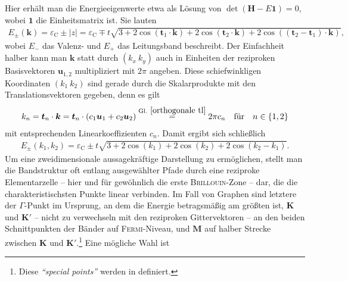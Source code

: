 \documentclass[a4paper, 10pt, twoside, openany]{book} %
\newcommand \braces[1]{\left \lbrace #1 \right \rbrace}
\def \vec {\boldsymbol}
\def \eC {\varepsilon_\mathrm{C}}
\begin{document}
Hier erhält man die Energieeigenwerte etwa als Lösung von $\det(\vec H - E \vec 1) = 0$, wobei $\vec 1$ die Einheitsmatrix ist. Sie lauten
%
\begin{align*}
    E_\pm(\vec k) = \eC \pm |z| = \eC \mp t \sqrt{3 + 2 \cos(\vec t_1 \cdot \vec k) + 2 \cos(\vec t_2 \cdot \vec k) + 2 \cos((\vec t_2 - \vec t_1) \cdot \vec k)},
\end{align*}
%
wobei $E_-$ das Valenz- und $E_+$ das Leitungsband beschreibt. Der Einfachheit halber kann man $\vec k$ statt durch $(k_x \ k_y)$ auch in Einheiten der reziproken Basisvektoren $\vec u_{1, 2}$ multipliziert mit $2 \pi$ angeben. Diese schiefwinkligen Koordinaten $(k_1 \ k_2)$ sind gerade durch die Skalarprodukte mit den Translationsvektoren gegeben, denn es gilt
%
\begin{align}
    k_n = \vec t_n \cdot \vec k = \vec t_n \cdot (c_1 \vec u_1 + c_2 \vec u_2) \overset{\rm Gl.~\ref{orthogonale tl}} = 2 \pi c_n \quad \text{für} \quad n \in \braces{1, 2}
    \label{Koordinaten}
\end{align}
%
mit entsprechenden Linearkoeffizienten $c_n$. Damit ergibt sich schließlich
%
\begin{align}
    E_\pm(k_1, k_2) = \eC \pm t \sqrt{3 + 2 \cos(k_1) + 2 \cos(k_2) + 2 \cos(k_2 - k_1)}.
    \label{Eigenenergien Graphen}
\end{align}
%
Um eine zweidimensionale aussagekräftige Darstellung zu ermöglichen, stellt man die Bandstruktur oft entlang ausgewählter Pfade durch eine reziproke Elementarzelle -- hier und für gewöhnlich die erste \textsc{Brillouin}-Zone -- dar, die die charakteristischsten Punkte linear verbinden.
%
Im Fall von Graphen sind letztere der $\vec \varGamma$-Punkt im Ursprung, an dem die Energie betragsmäßig am größten ist, $\vec K$ und $\vec K'$ -- nicht zu verwechseln mit den reziproken Gittervektoren -- an den beiden Schnittpunkten der Bänder auf \textsc{Fermi}-Niveau, und $\vec M$ auf halber Strecke zwischen $\vec K$ und $\vec K'$.\footnote{Diese \emph{"`special points"'} werden in \cite[S.~6]{Katsnelson1} definiert.} Eine mögliche Wahl ist
%
\end{document}
